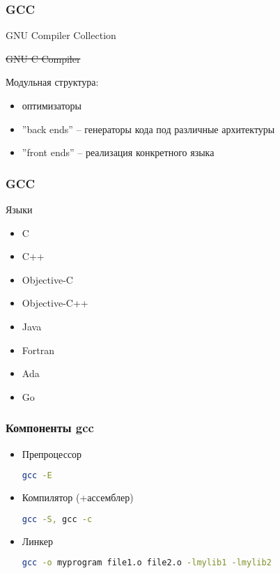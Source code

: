 \begin{frame}[fragile]
	\frametitle{GCC}

	\begin{block}{GNU Compiler Collection}

        \sout{GNU C Compiler}

        Модульная структура:

		\begin{itemize}
			\item оптимизаторы 
			\item ''back ends'' -- генераторы кода под различные архитектуры
			\item ''front ends'' -- реализация конкретного языка
		\end{itemize}
	\end{block}

\end{frame}


\begin{frame}[fragile]
	\frametitle{GCC}

	\begin{block}{Языки}

		\begin{itemize}
			\item C
			\item C++
			\item Objective-C
			\item Objective-C++
			\item Java
			\item Fortran
			\item Ada
			\item Go
		\end{itemize}
	\end{block}

\end{frame}



\begin{frame}[fragile]
\frametitle{Компоненты gcc}
\begin{itemize}
  \item Препроцессор
\begin{lstlisting}[language=sh]
gcc -E
\end{lstlisting}
  \item Компилятор (+ассемблер)
\begin{lstlisting}[language=sh]
gcc -S, gcc -c
\end{lstlisting}
  \item Линкер
\begin{lstlisting}[language=sh]
gcc -o myprogram file1.o file2.o -lmylib1 -lmylib2
\end{lstlisting}
\end{itemize}
\end{frame}

